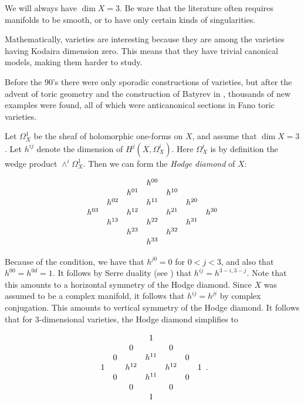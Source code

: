 We will always have $\dim X=3$. Be ware that the literature often requires \CY manifolds to be smooth, or to have only certain kinds of singularities.

Mathematically, \CY varieties are interesting because they are among the varieties having Kodaira dimension zero. This means that they have trivial canonical models, making them harder to study.

Before the 90's there were only sporadic constructions of \CY varieties, but after the advent of toric geometry and the construction of Batyrev in \cite{batyrev_mirrorsymmetry}, thousands of new examples were found, all of which were anticanonical sections in Fano toric varieties. 

Let $\Omega_X^1$ be the sheaf of holomorphic one-forms on $X$, and assume that $\dim X =3$. Let $h^{ij}$ denote the dimension of $H^j(X,\Omega_X^i)$. Here $\Omega_X^i$ is by definition the wedge product $\wedge^i \Omega_X^1$.  Then we can form the \emph{Hodge diamond} of $X$:

\[
\begin{array}[c]{ccccccc}
&&&               h^{00} \\  
 &         & h^{01} & & h^{10}  \\
&	h^{02} && h^{11}  && h^{20}  \\
   h^{03} && h^{12} && h^{21} && h^{30} \\
&	h^{13} && h^{22}  && h^{31}  \\
 &         & h^{23} & & h^{32}  \\
                &&& h^{33} 
\end{array}
\]

Because of the \CY condition, we have that $h^{j0}=0$ for $0 < j < 3$, and also that $h^{00}=h^{0d}=1$. It follows by Serre duality (see \cite[Corollary 7.7, Chapter III]{hartshorne}) that $h^{ij}=h^{3-i,3-j}$. Note that this amounts to a horizontal symmetry of the Hodge diamond. Since $X$ was assumed to be a complex manifold, it follows that $h^{ij}=h^{ji}$ by complex conjugation. This amounts to vertical symmetry of the Hodge diamond. It follows that for 3-dimensional \CY varieties, the Hodge diamond simplifies to

\[
\begin{array}[c]{ccccccc}
&&& 1 \\  
 &         & 0 & & 0  \\
&	0 && h^{11}  && 0  \\
1 && h^{12} && h^{12} && 1 \\
&	0 && h^{11}  && 0  \\
 &         & 0 & & 0  \\
 &&& 1 
\end{array}.
\]

